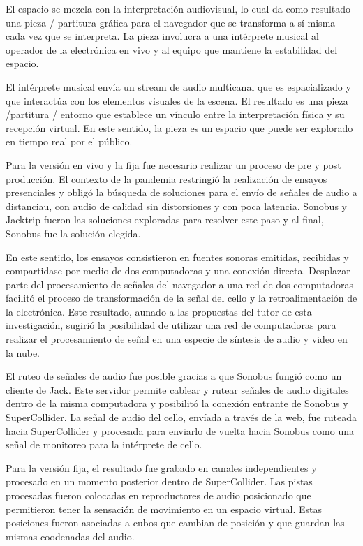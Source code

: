 El espacio se mezcla con la interpretación audiovisual, lo cual da como resultado una pieza / partitura gráfica para el navegador que se transforma a sí misma cada vez que se interpreta. La pieza involucra a una intérprete musical al operador de la electrónica en vivo y al equipo que mantiene la estabilidad del espacio. 

El intérprete musical envía un stream de audio multicanal que es espacializado y que interactúa con los elementos visuales de la escena. El resultado es una pieza /partitura / entorno que establece un vínculo entre la interpretación física y su recepción virtual. En este sentido, la pieza es un espacio que puede ser explorado en tiempo real por el público. 

Para la versión en vivo y la fija fue necesario realizar un proceso de pre y post producción. El contexto de la pandemia restringió la realización de ensayos presenciales y obligó la búsqueda de soluciones para el envío de señales de audio a distanciau, con audio de calidad sin distorsiones y con poca latencia. Sonobus y Jacktrip fueron las soluciones exploradas para resolver este paso y al final, Sonobus fue la solución elegida. 

En este sentido, los ensayos consistieron en fuentes sonoras emitidas, recibidas y compartidase por medio de dos computadoras y una conexión directa. Desplazar parte del procesamiento de señales del navegador a una red de dos computadoras facilitó el proceso de transformación de la señal del cello y la retroalimentación de la electrónica. Este resultado, aunado a las propuestas del tutor de esta investigación, sugirió la posibilidad de utilizar una red de computadoras para realizar el procesamiento de señal en una especie de síntesis de audio y video en la nube. 

El ruteo de señales de audio fue posible gracias a que Sonobus fungió como un cliente de Jack. Este servidor permite cablear y rutear señales de audio digitales dentro de la misma computadora y posibilitó la conexión entrante de Sonobus y SuperCollider. La señal de audio del cello, envíada a través de la web, fue ruteada hacia SuperCollider y procesada para enviarlo de vuelta hacia Sonobus como una señal de monitoreo para la intérprete de cello. 

Para la versión fija, el resultado fue grabado en canales independientes y procesado en un momento posterior dentro de SuperCollider. Las pistas procesadas fueron colocadas en reproductores de audio posicionado que permitieron tener la sensación de movimiento en un espacio virtual. Estas posiciones fueron asociadas a cubos que cambian de posición y que guardan las mismas coodenadas del audio.

